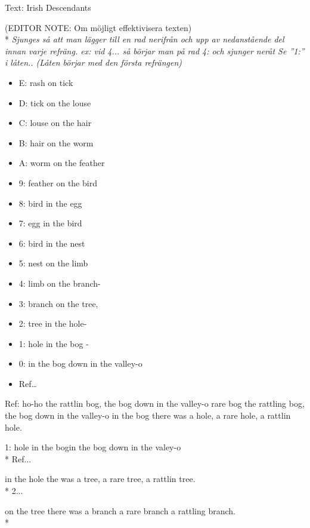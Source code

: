 \begin{SongText}
\begin{SongInfo}
    Text: Irish Descendants
\end{SongInfo}
\begin{SongVerse}
(EDITOR NOTE: Om möjligt effektivisera texten)\\*%
\emph{Sjunges så att man lägger till en rad nerifrån och upp av
nedanstående del innan varje refräng. ex: vid 4... så börjar man
på rad 4: och sjunger neråt Se ”1:” i låten.. (Låten börjar med
den första refrängen)}
\begin{itemize}
    \item E: rash on tick
    \item D: tick on the louse
    \item C: louse on the hair
    \item B: hair on the worm
    \item A: worm on the feather
    \item 9: feather on the bird
    \item 8: bird in the egg
    \item 7: egg in the bird
    \item 6: bird in the nest
    \item 5: nest on the limb
    \item 4: limb on the branch-
    \item 3: branch on the tree,
    \item 2: tree in the hole-
    \item 1: hole in the bog -
    \item 0: in the bog down in the valley-o
    \item Ref…
\end{itemize}
Ref:
ho-ho the rattlin bog, the bog down in the valley-o
rare bog the rattling bog, the bog down in the valley-o
in the bog there was a hole, a rare hole, a rattlin hole.
\end{SongVerse}
\begin{SongVerse}
1:
hole in the bogin the bog down in the valey-o\\*%
Ref... 
\end{SongVerse}
\begin{SongVerse}
in the hole the was a tree, a rare tree, a rattlin tree.\\*%
2...
\end{SongVerse}
\begin{SongVerse}
on the tree there was a branch a rare branch a rattling branch.\\*%

\end{SongVerse}
\end{SongText}
